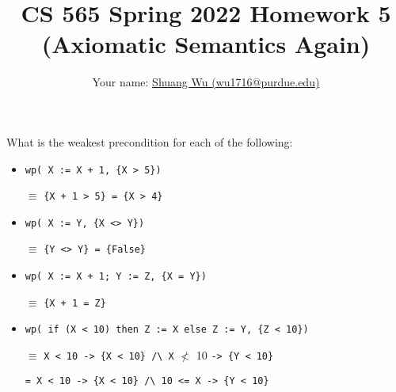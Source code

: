 \documentclass[12pt]{article}
\newenvironment{problem}[2][Problem]{\begin{trivlist}
\item[\hskip \labelsep {\bfseries #1}\hskip \labelsep {\bfseries #2.}]}{\end{trivlist}}
\begin{document}
\title{CS 565 Spring 2022 Homework 5 \\ (Axiomatic Semantics Again)}
\author{Your name: \underline{Shuang Wu (wu1716@purdue.edu)}}
\maketitle

\begin{problem}{1 (2 points)}
What is the weakest precondition for each of the following:

\begin{itemize}
\item[a. ]   \lstinline!wp( X := X + 1, {X > 5})!

$\equiv$ \lstinline!{X + 1 > 5} = {X > 4}!

\item[b. ]    \lstinline!wp( X := Y, {X <> Y})!

$\equiv$ \lstinline!{Y <> Y} = {False}!

\item[c. ]   \lstinline!wp( X := X + 1; Y := Z, {X = Y})!

$\equiv$ \lstinline!{X + 1 = Z}!

\item[d. ]   \lstinline!wp( if (X < 10) then Z := X else Z := Y, {Z < 10})! 

$\equiv$ \lstinline!X < 10 -> {X < 10} /\ X! $\nless$ 10 \lstinline!-> {Y < 10}!

\lstinline!= X < 10 -> {X < 10} /\ 10 <= X -> {Y < 10}!

\end{itemize}
\end{problem}

\pagebreak
\end{document}
